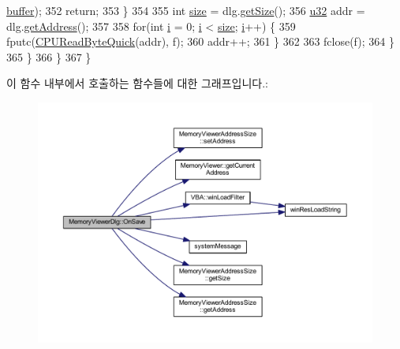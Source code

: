 \begin{DoxyCode}
      \mbox{\hyperlink{_g_b_a_8cpp_a28d4d3d8445e73a696b2d6f7eadabd96}{buffer}});
352           \textcolor{keywordflow}{return};
353         \}
354 
355         \textcolor{keywordtype}{int} \mbox{\hyperlink{expr-lex_8cpp_ab7d671599a7b25ca99a487fa341bc33a}{size}} = dlg.\mbox{\hyperlink{class_memory_viewer_address_size_ade3cfceb89cd35954e57d10dba882eb1}{getSize}}();
356         \mbox{\hyperlink{_system_8h_a10e94b422ef0c20dcdec20d31a1f5049}{u32}} addr = dlg.\mbox{\hyperlink{class_memory_viewer_address_size_a3d31492056e5b255aa882f7732671c4c}{getAddress}}();
357 
358         \textcolor{keywordflow}{for}(\textcolor{keywordtype}{int} \mbox{\hyperlink{expr-lex_8cpp_acb559820d9ca11295b4500f179ef6392}{i}} = 0; \mbox{\hyperlink{expr-lex_8cpp_acb559820d9ca11295b4500f179ef6392}{i}} < \mbox{\hyperlink{expr-lex_8cpp_ab7d671599a7b25ca99a487fa341bc33a}{size}}; \mbox{\hyperlink{expr-lex_8cpp_acb559820d9ca11295b4500f179ef6392}{i}}++) \{
359           fputc(\mbox{\hyperlink{_memory_viewer_dlg_8cpp_ab9d417f7a58507a4fd4a574eb00d7106}{CPUReadByteQuick}}(addr), f);
360           addr++;
361         \}
362 
363         fclose(f);
364       \}
365     \}
366   \}
367 \}
\end{DoxyCode}
이 함수 내부에서 호출하는 함수들에 대한 그래프입니다.\+:
\nopagebreak
\begin{figure}[H]
\begin{center}
\leavevmode
\includegraphics[width=350pt]{class_memory_viewer_dlg_aaa3651f618355f6d1d3bf3158cb9c812_cgraph}
\end{center}
\end{figure}
\mbox{\label{class_memory_viewer_dlg_ab7624247967998f1973da99a035a28e3}} 
